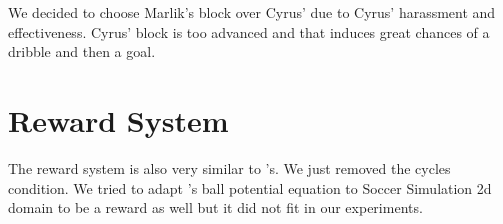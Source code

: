 We decided to choose Marlik's block over Cyrus' due to Cyrus' harassment and effectiveness. Cyrus' block is too advanced and that induces great chances of a dribble and then a goal. 

\section{Reward System}
The reward system is also very similar to \cite{cyrus}'s. We just removed the cycles condition. We tried to adapt \cite{tgze}'s ball potential equation to Soccer Simulation 2d domain to be a reward as well but it did not fit in our experiments.